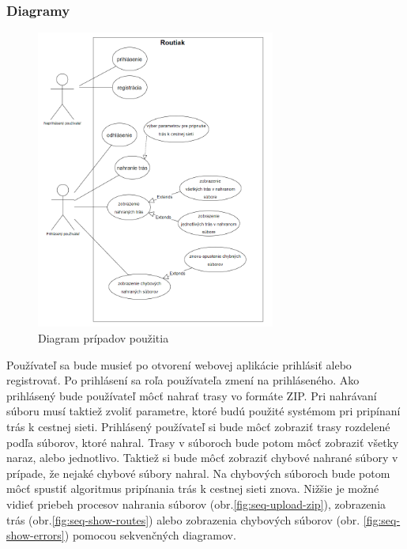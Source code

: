 \subsubsection{Diagramy}
\begin{figure}[H]
    \centering
    \includegraphics[width=0.7\textwidth]{img/diagramy/use-case.png}
    \caption{Diagram prípadov použitia}
    \label{fig:use-case}
\end{figure}
\indent \indent Používateľ sa bude musieť po otvorení webovej aplikácie prihlásiť alebo registrovať. Po prihlásení sa roľa používateľa zmení na prihláseného. Ako prihlásený bude používateľ môcť nahrať trasy vo formáte ZIP. Pri nahrávaní súboru musí taktiež zvoliť parametre, ktoré budú použité systémom pri pripínaní trás k cestnej sieti. Prihlásený používateľ si bude môcť zobraziť trasy rozdelené podľa súborov, ktoré nahral. Trasy v súboroch bude potom môcť zobraziť všetky naraz, alebo jednotlivo. Taktiež si bude môcť zobraziť chybové nahrané súbory v prípade, že nejaké chybové súbory nahral. Na chybových súboroch bude potom môcť spustiť algoritmus pripínania trás k cestnej sieti znova. Nižšie je možné vidieť priebeh procesov nahrania súborov (obr.\ref{fig:seq-upload-zip}), zobrazenia trás (obr.\ref{fig:seq-show-routes}) alebo zobrazenia chybových súborov (obr. \ref{fig:seq-show-errors}) pomocou sekvenčných diagramov.
